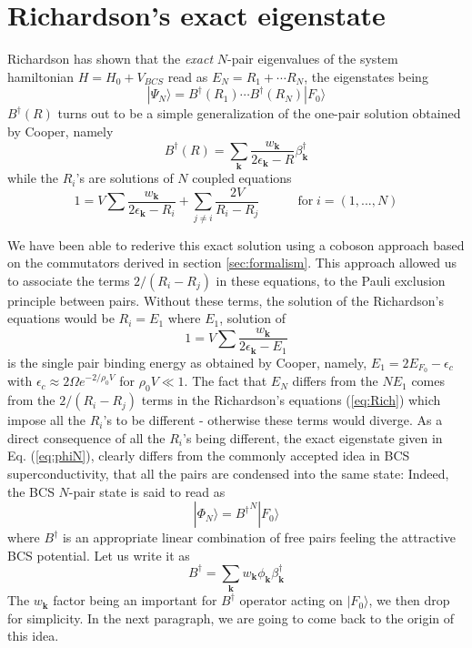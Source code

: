 \documentclass[aps,prb,preprint,groupedaddress,amsmath]{revtex4-1}
\newcommand{\vk}{\ensuremath{\mathbf{k}}}
\newcommand{\dg}{\ensuremath{\dagger}}
\begin{document}
\section{Richardson's exact eigenstate}
Richardson has shown that the \emph{exact} $N$-pair eigenvalues of the system hamiltonian $H=H_0+V_{BCS}$ read as $E_N=R_1+\cdots{}R_N$, the eigenstates being
\begin{equation}\label{eq:phiN}
|\Psi_N{\rangle}=B^{\dagger}(R_1)\cdots{}B^{\dagger}(R_N)|F_0{\rangle}  
\end{equation}
$B^{\dagger}(R)$ turns out to be a simple generalization of the one-pair solution obtained by Cooper, namely
\begin{equation}  \label{eq:B}
B^{\dagger}(R)=\sum_\vk\frac{w_\vk}{2\epsilon_\vk-R}\beta^{\dagger}_\vk
\end{equation}
while the $R_i$'s are solutions of $N$ coupled equations
\begin{equation}\label{eq:Rich}
1=V\sum\frac{w_{\mathbf{k} }}{2\epsilon_{\mathbf{k} }-R_i}+\sum_{j\neq{i}}%
\frac{2V}{R_i-R_j}\quad\qquad \text{for}\; i=\left(1,...,N\right) 
\end{equation}

We have been able to rederive this exact solution using a coboson approach based on the  commutators derived in section \ref{sec:formalism}.  This approach allowed us to associate the terms $2/(R_i-R_j)$ in these equations, to the Pauli exclusion principle between pairs.  Without these terms, the solution of the Richardson's equations would be $R_i=E_1$ where $E_1$, solution of
\begin{equation}
1=V\sum\frac{w_{\mathbf{k} }}{2\epsilon_{\mathbf{k} }-E_1}
\end{equation}
 is the single pair binding energy as obtained by Cooper, namely, $E_1=2E_{F_0}-\epsilon_c$ with $\epsilon_c\approx2\Omega{}e^{-2/\rho_0V}$ for $\rho_0V\ll1$. The fact that $E_N$ differs from the $NE_1$ comes from the $2/(R_i-R_j)$ terms in the Richardson's equations (\ref{eq:Rich})  which impose all the $R_i$'s to be different - otherwise these terms would diverge. As a direct consequence of all the $R_i$'s being different, the exact eigenstate given in Eq. (\ref{eq:phiN}), clearly differs from the commonly accepted idea  in BCS superconductivity, that all the pairs are condensed into the same state:  Indeed, the BCS $N$-pair state is said to read as 
\begin{equation}\label{eq:phiNBcs}
|\Phi_N{\rangle}={B^{\dagger}}^N|F_0{\rangle}  
\end{equation}
where $B^\dagger$ is an appropriate linear combination of free pairs feeling the attractive BCS potential. Let us write it as 
\begin{equation}\label{eq:bBeta}
B^\dg=\sum_\vk w_{\mathbf{k} }\phi_\vk\beta^\dg_\vk
\end{equation}
The $w_{\mathbf{k} }$ factor  being an important for $B^\dg$ operator acting on $|F_0{\rangle}$, we then drop for simplicity. In the next paragraph, we are going to come back to the origin of this idea.  
\end{document}

